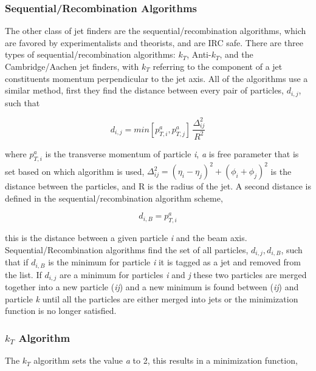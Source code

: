 \subsubsection{Sequential/Recombination Algorithms}

The other class of jet finders are the sequential/recombination algorithms, which are favored by experimentalists and theorists, and are IRC safe.  There are three types of sequential/recombination algorithms: $k_{T}$, Anti-$k_{T}$, and the Cambridge/Aachen jet finders, with $k_{T}$ referring to the component of a jet constituents momentum perpendicular to the jet axis.  All of the algorithms use a similar method, first they find the distance between every pair of particles, $d_{i,j}$,  such that



\begin{equation}
d_{i,j} = min[p^{a}_{T,i},p^{a}_{T,j}] \, \frac{\Delta^{2}_{ij}}{R^{2}}
\label{eq:JetAlgo}
\end{equation}

\noindent
where $p^{a}_{T,i}$ is the transverse momentum of particle \textit{i}, \textit{a} is free parameter that is set based on which algorithm is used, $\Delta^{2}_{ij} = (\eta_{i} - \eta_{j})^{2} + (\phi_{i} + \phi_{j})^{2}$ is the distance between the particles, and R is the radius of the jet.  A second distance is defined in the sequential/recombination algorithm scheme,

\begin{equation}
d_{i,B} = p^{a}_{T,i}
\label{eq:MinJet}
\end{equation}

\noindent
this is the distance between a given particle \textit{i} and the beam axis.  Sequential/Recombination algorithms find the set of all particles, ${d_{i,j},d_{i,B}}$, such that if $d_{i,B}$ is the minimum for particle \textit{i} it is tagged as a jet and removed from the list.  If $d_{i,j}$ are a minimum for particles \textit{i} and \textit{j} these two particles are merged together into a new particle (\textit{ij}) and a new minimum is found between (\textit{ij}) and particle \textit{k} until all the particles are either merged into jets or the minimization function is no longer satisfied.

\subsubsection{$k_{T}$ Algorithm}
The $k_{T}$ algorithm sets the value \textit{a} to 2, this results in a minimization function,

